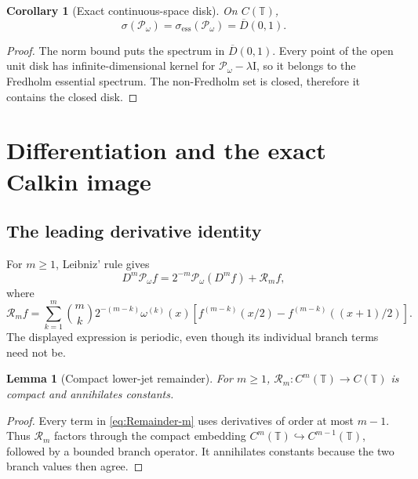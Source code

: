 \documentclass[11pt,a4paper]{article}
\newtheorem{lemma}[theorem]{Lemma}
\newtheorem{corollary}[theorem]{Corollary}
\theoremstyle{definition}
\theoremstyle{remark}
\newcommand{\T}{\mathbb T}
\newcommand{\Dbar}[1]{\overline{D}(0,#1)}
\newcommand{\spec}{\sigma}
\newcommand{\spece}{\sigma_{\mathrm{ess}}}
\newcommand{\Pop}{\mathcal P}
\newcommand{\id}{\mathrm I}
\begin{document}
\begin{corollary}[Exact continuous-space disk]
\label{cor:C0-disk}
On $C(\T)$,
\begin{equation}
 \spec(\Pop_\omega)=\spece(\Pop_\omega)=\Dbar1.
 \label{eq:C0-disk}
\end{equation}
\end{corollary}
\begin{proof}
The norm bound puts the spectrum in $\Dbar1$.  Every point of the open unit
disk has infinite-dimensional kernel for $\Pop_\omega-\lambda\id$, so it
belongs to the Fredholm essential spectrum.  The non-Fredholm set is closed,
therefore it contains the closed disk.
\end{proof}

\section{Differentiation and the exact Calkin image}
\label{sec:calkin}

\subsection{The leading derivative identity}
For $m\ge1$, Leibniz' rule gives
\begin{equation}
 D^m\Pop_\omega f=2^{-m}\Pop_\omega(D^m f)+\mathcal R_m f,
 \label{eq:derivative-identity}
\end{equation}
where
\begin{equation}
 \mathcal R_m f=
 \sum_{k=1}^{m}\binom{m}{k}2^{-(m-k)}\omega^{(k)}(x)
 \left[f^{(m-k)}(x/2)-f^{(m-k)}((x+1)/2)\right].
 \label{eq:Remainder-m}
\end{equation}
The displayed expression is periodic, even though its individual branch
terms need not be.

\begin{lemma}[Compact lower-jet remainder]
\label{lem:compact-remainder}
For $m\ge1$, $\mathcal R_m:C^m(\T)\to C(\T)$ is compact and annihilates
constants.
\end{lemma}
\begin{proof}
Every term in \eqref{eq:Remainder-m} uses derivatives of order at most
$m-1$.  Thus $\mathcal R_m$ factors through the compact embedding
$C^m(\T)\hookrightarrow C^{m-1}(\T)$, followed by a bounded branch operator.
It annihilates constants because the two branch values then agree.
\end{proof}
\end{document}
